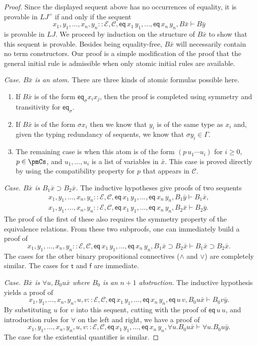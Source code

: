 \documentclass[10pt,a4paper]{article}
\newcommand{\pmLJ}{\mathit{LJ}}
\newcommand{\pmEa}{\mathcal E}\newcommand{\pmCa}{\mathcal C}
\newcommand{\pmeq}{\mathsf{eq}}
\newcommand{\pmt}{\mathsf t}\newcommand{\pmf}{\mathsf f}
\newcommand{\pmseq}[3]{#1\mathbin{::}#2\vdash #3}
\newcommand{\pmbx}{\bar x}\newcommand{\pmby}{\bar y}
\begin{document}
\begin{proof}
Since the displayed sequent above has no occurrences of equality, it is provable in $\pmLJ^=$ if and only if the sequent
\[\pmseq{x_1,y_1,\ldots,x_n,y_n}{\pmEa,\pmCa,\pmeq\,x_1\,y_1,\ldots,\pmeq\,x_n\,y_n,B\pmbx}{B\pmby}\]
is provable in $\pmLJ$. We proceed by induction on the structure of $B\pmbx$ to show that this sequent is provable. Besides being equality-free, $B\pmbx$ will necessarily contain no term constructors. Our proof is a simple modification of the proof that the general initial rule is admissible when only atomic initial rules are available.\par
\emph{Case. $B\pmbx$ is an atom.} There are three kinds of atomic formulas possible here.
\begin{enumerate}
\item If $B\pmbx$ is of the form $\pmeq_\sigma x_i x_j$, then the proof is completed using symmetry and transitivity for $\pmeq_\sigma$.
\item If $B\pmbx$ is of the form $\sigma x_i$ then we know that $y_i$ is of the same type as $x_i$ and, given the typing redundancy of sequents, we know that $\sigma y_i\in\Gamma$.
\item The remaining case is when this atom is of the form $(p\,u_1\cdots u_i)$ for $i\geq0$, $p\in\pmCs$, and $u_1,\ldots,u_i$ is a list of variables in $\pmbx$. This case is proved directly by using the compatibility property for $p$ that appears in $\pmCa$.
\end{enumerate}
\emph{Case. $B\pmbx$ is $B_1\pmbx\supset B_2\pmbx$.} The inductive hypotheses give proofs of two sequents
\begin{gather*}
\pmseq{x_1,y_1,\ldots,x_n,y_n}{\pmEa,\pmCa,\pmeq\,x_1\,y_1,\ldots,\pmeq\,x_n\,y_n,B_1\pmby}{B_1\pmbx},\\
\pmseq{x_1,y_1,\ldots,x_n,y_n}{\pmEa,\pmCa,\pmeq\,x_1\,y_1,\ldots,\pmeq\,x_n\,y_n,B_2\pmbx}{B_2\pmby}.
\end{gather*}
The proof of the first of these also requires the symmetry property of the equivalence relations. From these two subproofs, one can immediately build a proof of
\[\pmseq{x_1,y_1,\ldots,x_n,y_n}{\pmEa,\pmCa,\pmeq\,x_1\,y_1,\ldots,\pmeq\,x_n\,y_n,B_1\pmbx\supset B_2\pmbx}{B_1\pmbx\supset B_2\pmbx}.\]
The cases for the other binary propositional connectives ($\wedge$ and $\vee$) are completely similar. The cases for $\pmt$ and $\pmf$ are immediate.\par
\emph{Case. $B\pmbx$ is $\forall u,B_0 u\pmbx$ where $B_0$ is an $n+1$ abstraction.} The inductive hypothesis yields a proof of
\[\pmseq{x_1,y_1,\ldots,x_n,y_n,u,v}{\pmEa,\pmCa,\pmeq\,x_1\,y_1,\ldots,\pmeq\,x_n\,y_n,\pmeq\,u\,v,B_0u\pmbx}{B_0v\pmby}.\]
By substituting $u$ for $v$ into this sequent, cutting with the proof of $\pmeq\,u\,u$, and introduction rules for $\forall$ on the left and right, we have a proof of
\[\pmseq{x_1,y_1,\ldots,x_n,y_n,u,v}{\pmEa,\pmCa,\pmeq\,x_1\,y_1,\ldots,\pmeq\,x_n\,y_n,\forall u.B_0u\pmbx}{\forall u.B_0u\pmby}.\]
The case for the existential quantifier is similar.
\end{proof}
\end{document}
